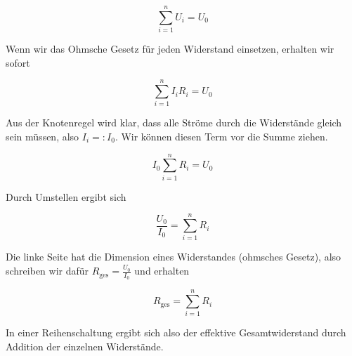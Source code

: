 \documentclass[a4paper,german,12pt,smallheadings]{scrartcl}
\begin{document}
\begin{equation}
  \sum_{i=1}^n U_i = U_0
\end{equation}

Wenn wir das Ohmsche Gesetz für jeden Widerstand einsetzen, erhalten wir sofort

\begin{equation}
  \sum_{i=1}^n I_i R_i = U_0
\end{equation}

Aus der Knotenregel wird klar, dass alle Ströme durch die Widerstände gleich
sein müssen, also $I_i =: I_0$. Wir können diesen Term vor die Summe ziehen.

\begin{equation}
  I_0 \sum_{i=1}^n R_i = U_0
\end{equation}

Durch Umstellen ergibt sich

\begin{equation}
  \frac{U_0}{I_0} = \sum_{i=1}^n R_i
\end{equation}

Die linke Seite hat die Dimension eines Widerstandes (ohmsches Gesetz), also
schreiben wir dafür $R_\text{ges} = \frac{U_0}{I_0}$ und erhalten


\begin{equation}
  R_\text{ges} = \sum_{i=1}^n R_i
\end{equation}

In einer Reihenschaltung ergibt sich also der effektive Gesamtwiderstand durch
Addition der einzelnen Widerstände.
\end{document}
